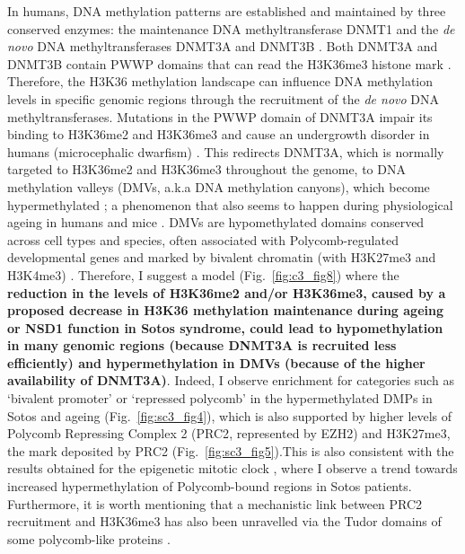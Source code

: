 In humans, DNA methylation patterns are established and maintained by three conserved enzymes: the maintenance DNA methyltransferase DNMT1 and the \textit{de novo} DNA methyltransferases DNMT3A and DNMT3B \citep{Schubeler2015}. Both DNMT3A and DNMT3B contain PWWP domains that can read the H3K36me3 histone mark \citep{Dhayalan2010,Baubec2015}. Therefore, the H3K36 methylation landscape can influence DNA methylation levels in specific genomic regions through the recruitment of the \textit{de novo} DNA methyltransferases. Mutations in the PWWP domain of DNMT3A impair its binding to H3K36me2 and H3K36me3 and cause an undergrowth disorder in humans (microcephalic dwarfism) \citep{Heyn2019}. This redirects DNMT3A, which is normally targeted to H3K36me2 and H3K36me3 throughout the genome, to DNA methylation valleys (\acrshort{DMV}s, a.k.a DNA methylation canyons), which become hypermethylated \citep{Heyn2019}; a phenomenon that also seems to happen during physiological ageing in humans \citep{Rakyan2010,Teschendorff2010,Slieker2016} and mice \citep{Cole2017}. DMVs are hypomethylated domains conserved across cell types and species, often associated with Polycomb-regulated developmental genes and marked by bivalent chromatin (with \acrshort{H3K27me3} and \acrshort{H3K4me3}) \citep{Xie2013,Long2013,Jeong2013,Li2018}. Therefore, I suggest a model (Fig.~\ref{fig:c3_fig8}) where the \textbf{reduction in the levels of H3K36me2 and/or H3K36me3, caused by a proposed decrease in H3K36 methylation maintenance during ageing or NSD1 function in Sotos syndrome, could lead to hypomethylation in many genomic regions (because DNMT3A is recruited less efficiently) and hypermethylation in DMVs (because of the higher availability of DNMT3A)}. Indeed, I observe enrichment for categories such as `bivalent promoter' or `repressed polycomb' in the hypermethylated DMPs in Sotos and ageing (Fig.~\ref{fig:sc3_fig4}), which is also supported by higher levels of Polycomb Repressing Complex 2 (\acrshort{PRC2}, represented by EZH2) and H3K27me3, the mark deposited by PRC2 (Fig.~\ref{fig:sc3_fig5}).This is also consistent with the results obtained for the epigenetic mitotic clock \citep{Yang2016}, where I observe a trend towards increased hypermethylation of Polycomb-bound regions in Sotos patients. Furthermore, it is worth mentioning that a mechanistic link between PRC2 recruitment and H3K36me3 has also been unravelled via the Tudor domains of some polycomb-like proteins \citep{Cai2013,Li2017}.

